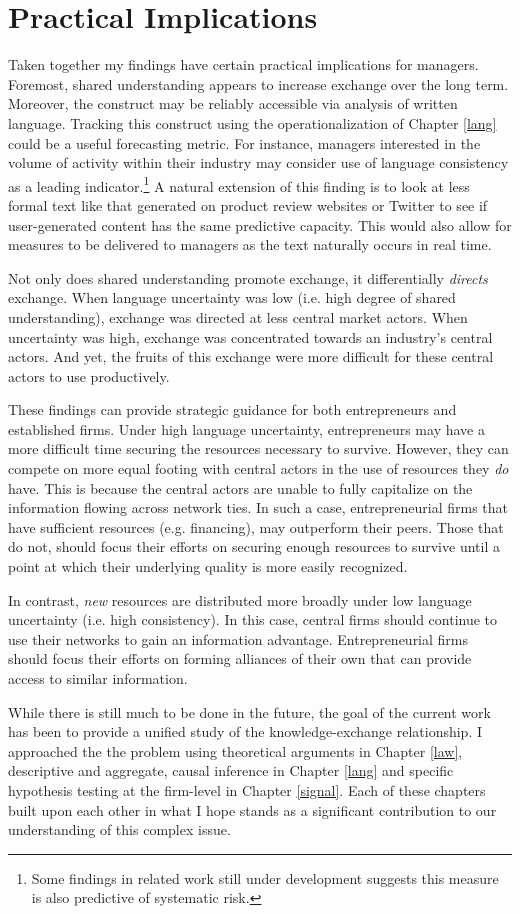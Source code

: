 \section{Practical Implications}
Taken together my findings have certain practical implications for managers. Foremost, shared understanding appears to increase exchange over the long term. Moreover, the construct may be reliably accessible via analysis of written language. Tracking this construct using the operationalization of Chapter \ref{lang} could be a useful forecasting metric. For instance, managers interested in the volume of activity within their industry may consider use of language consistency as a leading indicator.\footnote{Some findings in related work still under development suggests this measure is also predictive of systematic risk.} A natural extension of this finding is to look at less formal text like that generated on product review websites or Twitter to see if user-generated content has the same predictive capacity. This would also allow for measures to be delivered to managers as the text naturally occurs in real time.

Not only does shared understanding promote exchange, it differentially \emph{directs} exchange. When language uncertainty was low (i.e. high degree of shared understanding), exchange was directed at less central market actors. When uncertainty was high, exchange was concentrated towards an industry's central actors. And yet, the fruits of this exchange were more difficult for these central actors to use productively. 

These findings can provide strategic guidance for both entrepreneurs and established firms. Under high language uncertainty, entrepreneurs may have a more difficult time securing the resources necessary to survive. However, they can compete on more equal footing with central actors in the use of resources they \emph{do} have. This is because the central actors are unable to fully capitalize on the information flowing across network ties. In such a case, entrepreneurial firms that have sufficient resources (e.g. financing), may outperform their peers. Those that do not, should focus their efforts on securing enough resources to survive until a point at which their underlying quality is more easily recognized.

In contrast, \emph{new} resources are distributed more broadly under low language uncertainty (i.e. high consistency). In this case, central firms should continue to use their networks to gain an information advantage. Entrepreneurial firms should focus their efforts on forming alliances of their own that can provide access to similar information.

While there is still much to be done in the future, the goal of the current work has been to provide a unified study of the knowledge-exchange relationship. I approached the the problem using theoretical arguments in Chapter \ref{law}, descriptive and aggregate, causal inference in Chapter \ref{lang} and specific hypothesis testing at the firm-level in Chapter \ref{signal}. Each of these chapters built upon each other in what I hope stands as a significant contribution to our understanding of this complex issue.

